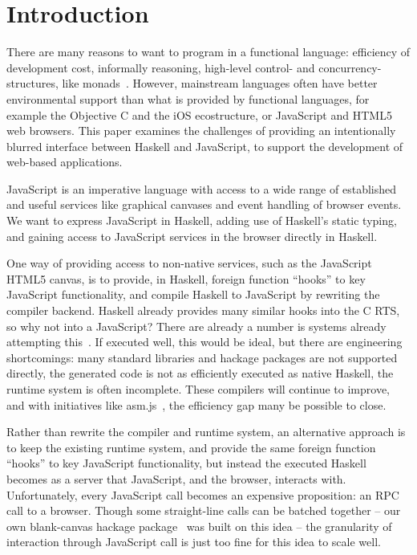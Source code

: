 \documentclass{llncs}
\begin{document}
\section{Introduction}\label{sec:intro}

There are many reasons to want to program in a functional language:
efficiency of development cost, informally reasoning, high-level 
control- and concurrency-structures, like monads~\cite{...}.
However, mainstream languages often have better environmental support
than what is provided by functional languages,
for example the Objective C and the iOS ecostructure, or JavaScript and HTML5
web browsers.
This paper examines the challenges of providing
an intentionally blurred interface between Haskell
and JavaScript, to support the development of web-based applications.

JavaScript is an imperative language with access to a wide range
of established and useful services like graphical canvases and event
handling of browser events. 
We want to express JavaScript in Haskell, adding use
of Haskell's static typing, and gaining access to JavaScript services
in the browser directly in Haskell.


One way of providing access to non-native services,
such as the JavaScript HTML5 canvas, is to provide, in Haskell, 
foreign function ``hooks'' to key JavaScript functionality,
and compile Haskell to JavaScript by rewriting the
compiler backend.
Haskell already provides many similar hooks into the C RTS,
so why not into a JavaScript?
There are already a number is systems already attempting this~\cite{...}.
If executed well, this would be ideal,
but there are engineering shortcomings: 
many standard libraries and hackage packages are not supported directly,
the generated code is not as efficiently executed as native Haskell,
the runtime system is often incomplete. These compilers will continue
to improve, and with initiatives like asm.js~\cite{...},
the efficiency gap many be possible to close.

Rather than rewrite the compiler and runtime system,
an alternative approach is to keep the existing
runtime system, and provide the same 
foreign function ``hooks'' to key JavaScript functionality,
but instead the executed Haskell becomes as a server that JavaScript,
and the browser, interacts with.
Unfortunately, every JavaScript call becomes an expensive proposition: an RPC call
to a browser.
Though some straight-line calls can be batched together --
our own blank-canvas hackage package~\cite{Hackage:11:blank-canvas} was built on this idea --
the granularity of interaction through JavaScript call is just too fine for
this idea to scale well.
\end{document}
